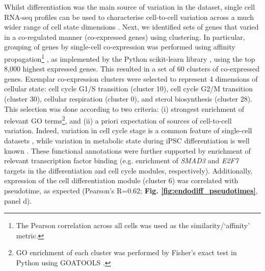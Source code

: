 Whilst differentiation was the main source of variation in the dataset, single cell RNA-seq profiles can be used to characterise cell-to-cell variation across a much wider range of cell state dimensions \cite{buettner2015computational, buettner2017f, fan2016characterizing}. 
Next, we identified sets of genes that varied in a co-regulated manner (co-expressed genes) using clustering.
In particular, grouping of genes by single-cell co-expression was performed using affinity propagation\footnote{The Pearson correlation across all cells was used as the similarity/‘affinity’ metric.} \cite{frey2007clustering}, as implemented by the Python scikit-learn library \cite{garreta2013learning}, using the top 8,000 highest expressed genes.
This resulted in a set of 60 clusters of co-expressed genes. 
Exemplar co-expression clusters were selected to represent 4 dimensions of
cellular state: cell cycle G1/S transition (cluster
10), cell cycle G2/M transition (cluster 30), cellular respiration (cluster 0), and
sterol biosynthesis (cluster 28). 
This selection was done according to two criteria: (i) strongest enrichment of relevant GO terms\footnote{GO enrichment of each cluster was performed by Fisher’s exact test in Python using GOATOOLS \cite{klopfenstein2018goatools}.}, and
(ii) a priori expectation of sources of cell-to-cell variation. 
Indeed, variation in cell cycle stage is a common feature of single-cell datasets \cite{buettner2015computational}, while variation in metabolic state during iPSC differentiation is well known \cite{xu2013mitochondrial}.
These functional annotations were further supported by enrichment of relevant transcription factor binding (e.g. enrichment of \textit{SMAD3} and \textit{E2F7} targets in the differentiation and cell cycle modules, respectively). 
Additionally, expression of the cell differentiation module (cluster 6) was correlated with pseudotime, as expected (Pearson's R=0.62; \textbf{Fig. \ref{fig:endodiff_pseudotimes}}, panel d).\\

